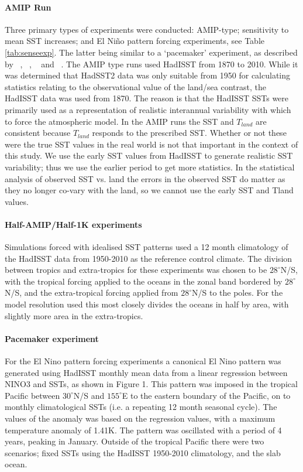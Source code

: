 \paragraph{AMIP Run}
Three primary types of experiments were conducted: AMIP-type; sensitivity to 
mean SST increases; and El Ni{\~n}o pattern forcing experiments, see Table 
\ref{tab:senseexp}. The latter being similar to a `pacemaker' experiment, as 
described by ~\citealt{Alexander1992}, ~\citealt{Alexander1992a}, 
~\citealt{Lau2000} and ~\citealt{Lu2011}. The AMIP type runs used HadISST from 
1870 to 2010. While it was determined that HadSST2 data was only suitable
from 1950 for calculating statistics relating to the observational value of the 
land/sea contrast, the HadISST data was used from 1870. The reason is that the 
HadISST SSTs were primarily used as a representation of realistic interannual 
variability with which to force the atmospheric model.  In the AMIP runs the SST 
and $T_{land}$ are consistent because $T_{land}$ responds to the prescribed SST.  
Whether or not these were the true SST values in the real world is not that 
important in the context of this study.  We use the early SST values from 
HadISST to generate realistic SST variability; thus we use the earlier period to 
get more statistics. In the statistical analysis of observed SST vs. land the 
errors in the observed SST do matter as they no longer co-vary with the land, so 
we cannot use the early SST and Tland values. 

\paragraph{Half-AMIP/Half-1K experiments}
Simulations forced with idealised SST patterns used a 12 month climatology of 
the HadISST data from 1950-2010 as the reference control climate. The division 
between tropics and extra-tropics for these experiments was chosen to be 
$28^{\circ}$N/S, with the tropical forcing applied to the oceans in the zonal 
band bordered by $28^{\circ}$N/S, and the extra-tropical forcing applied from 
$28^{\circ}$N/S to the poles. For the model resolution used this most closely 
divides the oceans in half by area, with slightly more area in the 
extra-tropics.

\paragraph{Pacemaker experiment}
For the El Nino pattern forcing experiments a canonical El Nino pattern was 
generated using HadISST monthly mean data from a linear regression between NINO3 
and SSTs, as shown in Figure 1. This pattern was imposed in the tropical Pacific 
between $30^{\circ}$N/S and $155^{\circ}$E to the eastern boundary of the 
Pacific, on to monthly climatological SSTs (i.e. a repeating 12 month seasonal 
cycle).  The values of the anomaly was based on the regression values, with a 
maximum temperature anomaly of 1.41K.  The pattern was oscillated with a period 
of 4 years, peaking in January.  Outside of the tropical Pacific there were two 
scenarios; fixed SSTs using the HadISST 1950-2010 climatology, and the slab 
ocean. 


